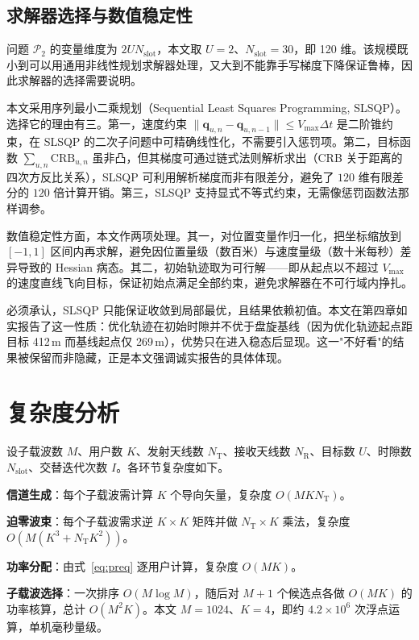 \subsection{求解器选择与数值稳定性}
\label{sec:solver}

问题 $\mathcal{P}_{2}$ 的变量维度为 $2UN_{\mathrm{slot}}$，本文取 $U=2$、$N_{\mathrm{slot}}=30$，即 120 维。该规模既小到可以用通用非线性规划求解器处理，又大到不能靠手写梯度下降保证鲁棒，因此求解器的选择需要说明。

本文采用序列最小二乘规划（Sequential Least Squares Programming, SLSQP）。选择它的理由有三。第一，速度约束 $\|\mathbf{q}_{u,n}-\mathbf{q}_{u,n-1}\|\le V_{\max}\Delta t$ 是二阶锥约束，在 SLSQP 的二次子问题中可精确线性化，不需要引入惩罚项。第二，目标函数 $\sum_{u,n}\mathrm{CRB}_{u,n}$ 虽非凸，但其梯度可通过链式法则解析求出（CRB 关于距离的四次方反比关系），SLSQP 可利用解析梯度而非有限差分，避免了 $120$ 维有限差分的 $120$ 倍计算开销。第三，SLSQP 支持显式不等式约束，无需像惩罚函数法那样调参。

数值稳定性方面，本文作两项处理。其一，对位置变量作归一化，把坐标缩放到 $[-1,1]$ 区间内再求解，避免因位置量级（数百米）与速度量级（数十米每秒）差异导致的 Hessian 病态。其二，初始轨迹取为可行解——即从起点以不超过 $V_{\max}$ 的速度直线飞向目标，保证初始点满足全部约束，避免求解器在不可行域内挣扎。

必须承认，SLSQP 只能保证收敛到局部最优，且结果依赖初值。本文在第四章如实报告了这一性质：优化轨迹在初始时隙并不优于盘旋基线（因为优化轨迹起点距目标 412\,m 而基线起点仅 269\,m），优势只在进入稳态后显现。这一"不好看"的结果被保留而非隐藏，正是本文强调诚实报告的具体体现。

\section{复杂度分析}
\label{sec:complexity}

设子载波数 $M$、用户数 $K$、发射天线数 $N_{\mathrm{T}}$、接收天线数 $N_{\mathrm{R}}$、目标数 $U$、时隙数 $N_{\mathrm{slot}}$、交替迭代次数 $I$。各环节复杂度如下。

\textbf{信道生成}：每个子载波需计算 $K$ 个导向矢量，复杂度 $O(MKN_{\mathrm{T}})$。

\textbf{迫零波束}：每个子载波需求逆 $K\times K$ 矩阵并做 $N_{\mathrm{T}}\times K$ 乘法，复杂度 $O(M(K^{3}+N_{\mathrm{T}}K^{2}))$。

\textbf{功率分配}：由式~\eqref{eq:preq} 逐用户计算，复杂度 $O(MK)$。

\textbf{子载波选择}：一次排序 $O(M\log M)$，随后对 $M+1$ 个候选点各做 $O(MK)$ 的功率核算，总计 $O(M^{2}K)$。本文 $M=1024$、$K=4$，即约 $4.2\times10^{6}$ 次浮点运算，单机毫秒量级。

